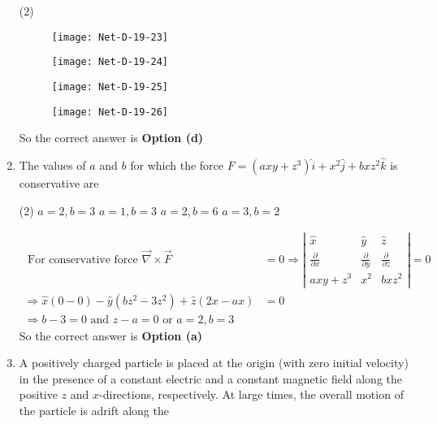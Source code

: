 \begin{enumerate}
 \begin{tasks}(2)
	\task[\textbf{a.}]
	\begin{figure}[H]
		\centering
		\texttt{[image: Net-D-19-23]}
	\end{figure}
	\task[\textbf{b.}]
	\begin{figure}[H]
		\centering
		\texttt{[image: Net-D-19-24]}
	\end{figure}
	\task[\textbf{c.}]
	\begin{figure}[H]
		\centering
		\texttt{[image: Net-D-19-25]}
	\end{figure}
	\task[\textbf{d.}] 
	\begin{figure}[H]
		\centering
		\texttt{[image: Net-D-19-26]}
	\end{figure}
\end{tasks}	
\begin{answer}
	So the correct answer is \textbf{Option (d)}
\end{answer}
\item The values of $a$ and $b$ for which the force $F=\left(a x y+z^{3}\right) \hat{i}+x^{2} \hat{j}+b x z^{2} \hat{k}$ is conservative are
 \begin{tasks}(2)
	\task[\textbf{a.}]$a=2, b=3$
	\task[\textbf{b.}]$a=1, b=3$
	\task[\textbf{c.}]$a=2, b=6$
	\task[\textbf{d.}]$a=3, b=2$
\end{tasks}
\begin{answer}
	\begin{align*}
	\text { For conservative force } \vec{\nabla} \times \vec{F}&=0 \Rightarrow\left|\begin{array}{ccc}
	\hat{x} & \hat{y} & \hat{z} \\
	\frac{\partial}{\partial x} & \frac{\partial}{\partial y} & \frac{\partial}{\partial z} \\
	a x y+z^{3} & x^{2} & b x z^{2}
	\end{array}\right|=0\\
	\Rightarrow \hat{x}(0-0)-\hat{y}\left(b z^{2}-3 z^{2}\right)+\hat{z}(2 x-a x)&=0 \\
	\Rightarrow b-3=0 \text { and } z-a=0 \text { or } a=2, b=3
	\end{align*}
		So the correct answer is \textbf{Option (a)}
\end{answer}
\item A positively charged particle is placed at the origin (with zero initial velocity) in the presence of a constant electric and a constant magnetic field along the positive $z$ and $x$-directions, respectively. At large times, the overall motion of the particle is adrift along the

\end{enumerate}
